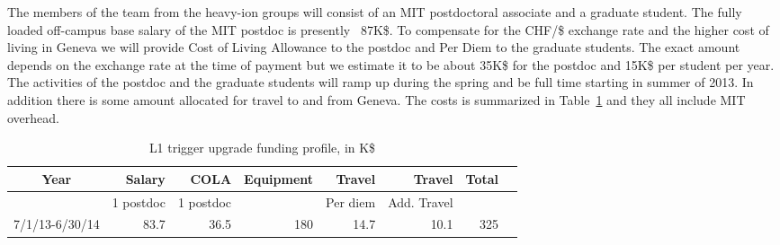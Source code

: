 The members of the team from the heavy-ion groups will consist of an MIT postdoctoral associate and a graduate student. The fully loaded off-campus base salary of the MIT postdoc is presently ~87K\$. To compensate for the CHF/\$ exchange rate and the higher cost of living in Geneva we will provide Cost of Living Allowance to the postdoc and Per Diem to the graduate students. The exact amount depends on the exchange rate at the time of payment but we estimate it to be about 35K\$ for the postdoc and 15K\$ per student per year.  The activities of the postdoc and the graduate students will ramp up during the spring and be full time starting in summer of 2013. In addition there is some amount allocated for travel to and from Geneva. The costs is summarized in Table~\ref{OpCost} and they all include MIT overhead.

\begin{table}[hbt]
\begin{center}
\begin{tabular}{|c|r|r|r|r|r|r|r|}
\hline
Year        & Salary & COLA & Equipment & Travel & Travel& Total \\ \hline
            &  1 postdoc   & 1 postdoc   &  & Per diem       &  Add. Travel     &     \\ \hline
7/1/13-6/30/14  &  83.7   & 36.5   & 180      & 14.7  &  10.1     & 325    \\ \hline
\end{tabular}
\end{center}
\caption{L1 trigger upgrade funding profile, in K\$}
\label{OpCost}
\end{table}
